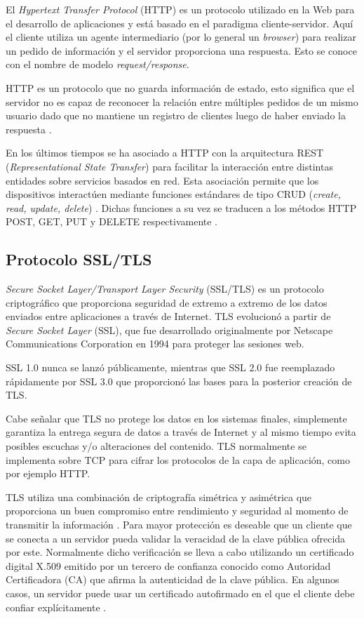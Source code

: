 El \textit{Hypertext Transfer Protocol} (HTTP)\citep{http:1} es un protocolo utilizado en la Web para el desarrollo de aplicaciones y está basado en el paradigma cliente-servidor. Aquí el cliente utiliza un agente intermediario (por lo general un \textit{browser}) para realizar un pedido de información y el servidor proporciona una respuesta. Esto se conoce con el nombre de modelo \textit{request/response}.

HTTP es un protocolo que no guarda información de estado, esto significa que el servidor no es capaz de reconocer la relación entre múltiples pedidos de un mismo usuario dado que no mantiene un registro de clientes luego de haber enviado la respuesta \citep{oreilly:1}.

En los últimos tiempos se ha asociado a HTTP con la arquitectura REST (\textit{Representational State Transfer})\citep{rest} para facilitar la interacción entre distintas entidades sobre servicios basados en red. Esta asociación permite que los dispositivos interactúen mediante funciones estándares de tipo CRUD (\textit{create, read, update, delete})  \citep{10.1145/3292674}. Dichas funciones a su vez se traducen a los métodos HTTP POST, GET, PUT y DELETE respectivamente \citep{GLAROUDIS2020107037}. 

\subsection{Protocolo SSL/TLS}
\label{sec:Protocolo SSL/TLS}
\textit{Secure Socket Layer/Transport Layer Security} (SSL/TLS) \citep{tls:1} es un protocolo criptográfico que proporciona seguridad de extremo a extremo de los datos enviados entre aplicaciones a través de Internet.
TLS evolucionó a partir de \textit{Secure Socket Layer} (SSL), que fue desarrollado originalmente por Netscape Communications Corporation en 1994 para proteger las sesiones web. 

SSL 1.0 nunca se lanzó públicamente, mientras que SSL 2.0 fue reemplazado rápidamente por SSL 3.0 que proporcionó las bases para la posterior creación de TLS. 

Cabe señalar que TLS no protege los datos en los sistemas finales, simplemente garantiza la entrega segura de datos a través de Internet y al mismo tiempo evita posibles escuchas y/o alteraciones del contenido.
TLS normalmente se implementa sobre TCP \citep{rfc793} para cifrar los protocolos de la capa de aplicación, como por ejemplo HTTP.

TLS utiliza una combinación de criptografía simétrica y asimétrica que proporciona un buen compromiso entre rendimiento y seguridad al momento de transmitir la información \citep{tls:2}. Para mayor protección es deseable que un cliente que se conecta a un servidor pueda validar la veracidad de la clave pública ofrecida por este. Normalmente dicho verificación se lleva a cabo utilizando un certificado digital X.509 \citep{x509:1} emitido por un tercero de confianza conocido como Autoridad Certificadora (CA) que afirma la autenticidad de la clave pública. En algunos casos, un servidor puede usar un certificado autofirmado en el que el cliente debe confiar explícitamente \citep{tls:2}.

